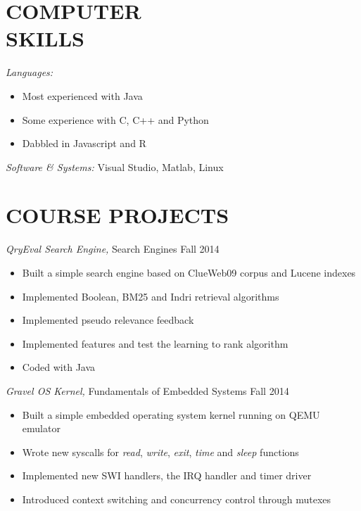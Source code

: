 \documentclass[margin, 10pt]{res} %
\begin{document}
\begin{resume}

\section{COMPUTER \\ SKILLS}

{\sl Languages:}
\begin{itemize} \itemsep -2pt %
\item Most experienced with Java
\item Some experience with C, C++ and Python
\item Dabbled in Javascript and R
\end{itemize}
{\sl Software \& Systems:} Visual Studio, Matlab, Linux

\section{COURSE PROJECTS}
{\sl QryEval Search Engine,} Search Engines \hfill Fall 2014 
\begin{itemize} \itemsep -2pt
\item Built a simple search engine based on ClueWeb09 corpus and Lucene indexes
\item Implemented Boolean, BM25 and Indri retrieval algorithms
\item Implemented pseudo relevance feedback
\item Implemented features and test the learning to rank algorithm
\item Coded with Java
\end{itemize}

{\sl Gravel OS Kernel,} Fundamentals of Embedded Systems \hfill Fall 2014 
\begin{itemize} \itemsep -2pt
\item Built a simple embedded operating system kernel running on QEMU emulator
\item Wrote new syscalls for {\sl read}, {\sl write}, {\sl exit}, {\sl time} and {\sl sleep} functions
\item Implemented new SWI handlers, the IRQ handler and timer driver
\item Introduced context switching and concurrency control through mutexes
\end{itemize}




\end{resume}
\end{document}
